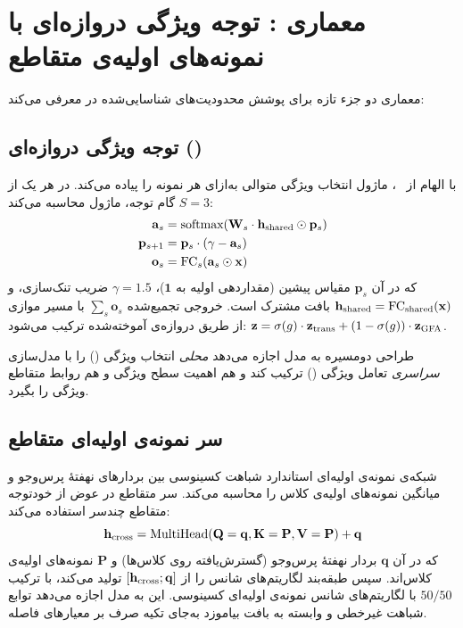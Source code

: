 \section{معماری : توجه ویژگی دروازه‌ای با نمونه‌های اولیه‌ی متقاطع}
\label{sec:v5_architecture}

معماری  دو جزء تازه برای پوشش محدودیت‌های شناسایی‌شده در  معرفی می‌کند:

\subsection{توجه ویژگی دروازه‌ای ()}

با الهام از ~\cite{arik2021tabnet}، ماژول  انتخاب ویژگی متوالی به‌ازای هر نمونه را پیاده می‌کند. در هر یک از $S=3$ گام توجه، ماژول محاسبه می‌کند:
\begin{align}
\mathbf{a}_s &= \text{softmax}(\mathbf{W}_s \cdot \mathbf{h}_{\text{shared}} \odot \mathbf{p}_s) \\
\mathbf{p}_{s+1} &= \mathbf{p}_s \cdot (\gamma - \mathbf{a}_s) \\
\mathbf{o}_s &= \text{FC}_s(\mathbf{a}_s \odot \mathbf{x})
\end{align}
که در آن $\mathbf{p}_s$ مقیاس پیشین (مقداردهی اولیه به $\mathbf{1}$)، $\gamma=1.5$ ضریب تنک‌سازی، و $\mathbf{h}_{\text{shared}} = \text{FC}_{\text{shared}}(\mathbf{x})$ بافت مشترک است. خروجی تجمیع‌شده $\sum_s \mathbf{o}_s$ با مسیر موازی  از طریق دروازه‌ی آموخته‌شده ترکیب می‌شود: $\mathbf{z} = \sigma(g) \cdot \mathbf{z}_{\text{trans}} + (1-\sigma(g)) \cdot \mathbf{z}_{\text{GFA}}$.

طراحی دومسیره به مدل اجازه می‌دهد \emph{محلی} انتخاب ویژگی () را با مدل‌سازی \emph{سراسری} تعامل ویژگی () ترکیب کند و هم اهمیت سطح ویژگی و هم روابط متقاطع ویژگی را بگیرد.

\subsection{سر نمونه‌ی اولیه‌ای متقاطع}

شبکه‌ی نمونه‌ی اولیه‌ای استاندارد شباهت کسینوسی بین بردارهای نهفتۀ پرس‌وجو و میانگین نمونه‌های اولیه‌ی کلاس را محاسبه می‌کند. سر متقاطع  در عوض از خودتوجه متقاطع چندسر استفاده می‌کند:
\begin{equation}
\mathbf{h}_{\text{cross}} = \text{MultiHead}(\mathbf{Q}=\mathbf{q}, \mathbf{K}=\mathbf{P}, \mathbf{V}=\mathbf{P}) + \mathbf{q}
\end{equation}
که در آن $\mathbf{q}$ بردار نهفتۀ پرس‌وجو (گسترش‌یافته روی کلاس‌ها) و $\mathbf{P}$ نمونه‌های اولیه‌ی کلاس‌اند. سپس  طبقه‌بند لگاریتم‌های شانس را از $[\mathbf{h}_{\text{cross}}; \mathbf{q}]$ تولید می‌کند، با ترکیب $50/50$ با لگاریتم‌های شانس نمونه‌ی اولیه‌ای کسینوسی. این به مدل اجازه می‌دهد توابع شباهت غیرخطی و وابسته به بافت بیاموزد به‌جای تکیه صرف بر معیارهای فاصله.

